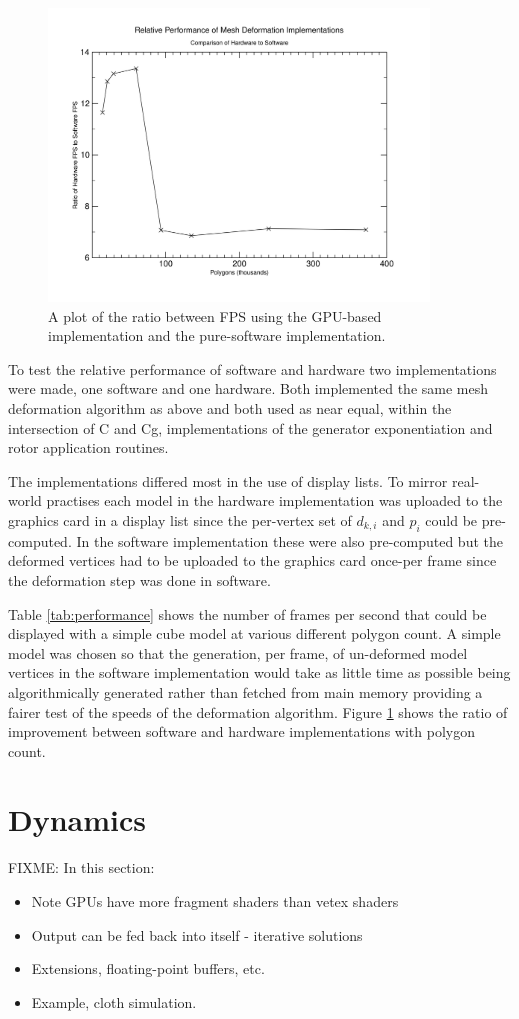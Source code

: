 \begin{figure}[p]
\centering
\includegraphics[width=0.9\textwidth]{performance}
\caption{\label{fig:performance}A plot of the ratio between FPS using the
GPU-based implementation and the pure-software implementation.}
\end{figure}

To test the relative performance of software and hardware two implementations
were made, one software and one hardware. Both implemented the same mesh deformation
algorithm as above and both used as near equal, within the intersection of C and
Cg, implementations of the generator exponentiation and rotor application
routines.

The implementations differed most in the use of display lists. To mirror real-world
practises each model in the hardware implementation was uploaded to the graphics
card in a display list since the per-vertex set of $d_{k,i}$ and $p_i$ could
be pre-computed. In the software implementation these were also pre-computed but the
deformed vertices had to be uploaded to the graphics card once-per frame since the
deformation step was done in software.

Table \ref{tab:performance} shows the number of frames per second that could be
displayed with a simple cube model at various different polygon count. A simple model
was chosen so that the generation, per frame, of un-deformed model vertices in the
software implementation would take as little time as possible being 
algorithmically generated rather than fetched from main memory providing a fairer
test of the speeds of the deformation algorithm. Figure \ref{fig:performance} shows
the ratio of improvement between software and hardware implementations with polygon
count.

\section{Dynamics}

FIXME: In this section:
\begin{itemize}
\item Note GPUs have more fragment shaders than vetex shaders
\item Output can be fed back into itself - iterative solutions
\item Extensions, floating-point buffers, etc.
\item Example, cloth simulation.
\end{itemize}
